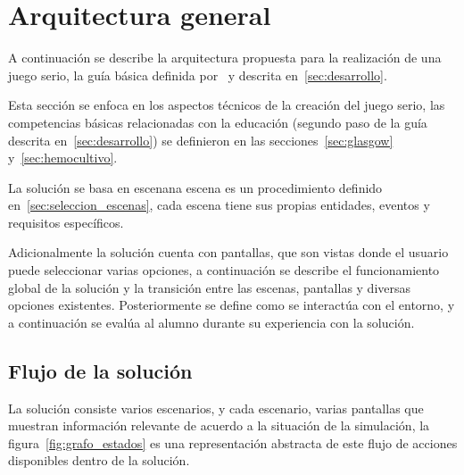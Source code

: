 
\section{Arquitectura general}
\label{sec:solucion}


A continuación se describe la arquitectura propuesta para la realización de una
juego serio,  la guía básica definida por~\cite{pereira2009design} y
descrita en~\ref{sec:desarrollo}.

Esta sección se enfoca en los aspectos técnicos de la creación del juego serio,
las competencias básicas relacionadas con la educación (segundo paso de la guía
descrita en~\ref{sec:desarrollo}) se definieron en las
secciones~\ref{sec:glasgow} y~\ref{sec:hemocultivo}.

La solución se basa en escenana escena es un procedimiento definido
en~\ref{sec:seleccion_escenas}, cada escena tiene sus propias entidades, eventos
y requisitos específicos. 


Adicionalmente la solución cuenta con pantallas, que son vistas donde el usuario
puede seleccionar varias opciones, a continuación se describe el funcionamiento
global de la solución y la transición entre las escenas, pantallas y diversas
opciones existentes. Posteriormente se define como se interactúa con el entorno,
y a continuación se evalúa al alumno durante su experiencia con la solución.

\subsection{Flujo de la solución}

La solución consiste varios escenarios, y cada escenario,  varias pantallas que muestran información relevante de acuerdo a
la situación de la simulación, la figura~\ref{fig:grafo_estados} es una
representación abstracta de este flujo de acciones disponibles dentro de la
solución.

